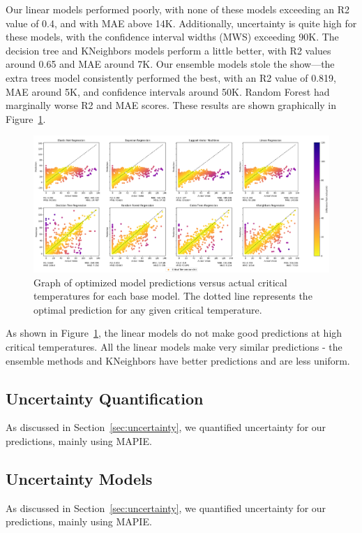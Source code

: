 \documentclass[twocolumn, nofootinbib, secnumarabic, amssymb, nobibnotes, aps, prd]{revtex4-2}
\begin{document}
Our linear models performed poorly, with none of these models exceeding an R2 value of 0.4, and with MAE above 14K. Additionally, uncertainty is quite high for these models, with the confidence interval widths (MWS) exceeding 90K. The decision tree and KNeighbors models perform a little better, with R2 values around 0.65 and MAE around 7K. Our ensemble models stole the show—the extra trees model consistently performed the best, with an R2 value of 0.819, MAE around 5K, and confidence intervals around 50K. Random Forest had marginally worse R2 and MAE scores. These results are shown graphically in Figure~\ref{fig:results}.

 \begin{figure}[!htb] %
    \centering
    \includegraphics[width=\textwidth]{images/results_optimized.png}
    \caption{Graph of optimized model predictions versus actual critical temperatures for each base model. The dotted line represents the optimal prediction for any given critical temperature.}
    \label{fig:results}
 \end{figure}

 \newpage
As shown in Figure~\ref{fig:results}, the linear models do not make good predictions at high critical temperatures. All the linear models make very similar predictions - the ensemble methods and KNeighbors have better predictions and are less uniform.

\subsection{Uncertainty Quantification}
As discussed in Section~\ref{sec:uncertainty}, we quantified uncertainty for our predictions, mainly using MAPIE.

\subsection{Uncertainty Models}
As discussed in Section~\ref{sec:uncertainty}, we quantified uncertainty for our predictions, mainly using MAPIE.
\end{document}
